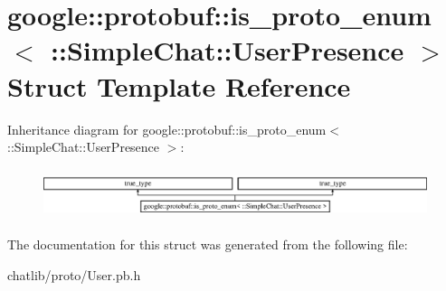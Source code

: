 \hypertarget{structgoogle_1_1protobuf_1_1is__proto__enum_3_01_1_1SimpleChat_1_1UserPresence_01_4}{\section{google\-:\-:protobuf\-:\-:is\-\_\-proto\-\_\-enum$<$ \-:\-:Simple\-Chat\-:\-:User\-Presence $>$ Struct Template Reference}
\label{structgoogle_1_1protobuf_1_1is__proto__enum_3_01_1_1SimpleChat_1_1UserPresence_01_4}
}
Inheritance diagram for google\-:\-:protobuf\-:\-:is\-\_\-proto\-\_\-enum$<$ \-:\-:Simple\-Chat\-:\-:User\-Presence $>$\-:\begin{figure}[H]
\begin{center}
\leavevmode
\includegraphics[height=1.481482cm]{structgoogle_1_1protobuf_1_1is__proto__enum_3_01_1_1SimpleChat_1_1UserPresence_01_4}
\end{center}
\end{figure}


The documentation for this struct was generated from the following file\-:\begin{DoxyCompactItemize}
\item 
chatlib/proto/User.\-pb.\-h\end{DoxyCompactItemize}
